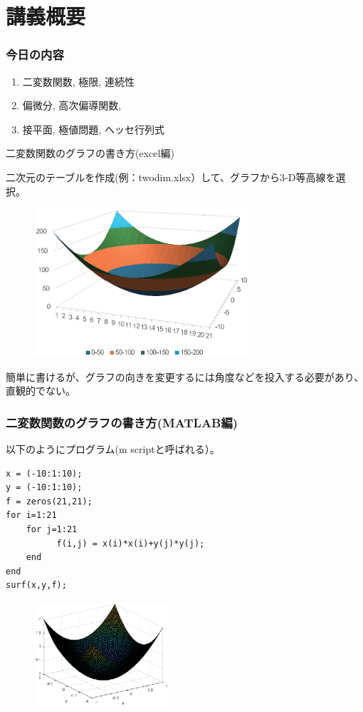 
\section{講義概要}


\begin{frame}
\frametitle{今日の内容}



\begin{enumerate}
\item 二変数関数, 極限, 連続性
\item 偏微分, 高次偏導関数,
\item 接平面, 極値問題, ヘッセ行列式
\end{enumerate} 



\end{frame}
\begin{slide}{二変数関数のグラフの書き方(excel編)}

二次元のテーブルを作成(例：twodim.xlsx）して、グラフから3-D等高線を選択。
\begin{figure}[h]
\centering
\includegraphics[width=8cm]{calculus10/twodim.eps}
\end{figure}
簡単に書けるが、グラフの向きを変更するには角度などを投入する必要があり、直観的でない。

\end{slide}
\begin{frame}[fragile]
\frametitle{二変数関数のグラフの書き方(MATLAB編)}
以下のようにプログラム(m scriptと呼ばれる）。

 \begin{lstlisting}
x = (-10:1:10);
y = (-10:1:10);
f = zeros(21,21);
for i=1:21
    for j=1:21
          f(i,j) = x(i)*x(i)+y(j)*y(j);
    end
end
surf(x,y,f);
 \end{lstlisting}
\begin{figure}[h]
\centering
\includegraphics[width=5cm]{calculus10/twodimmatlab.eps}
\end{figure}

\end{frame}




